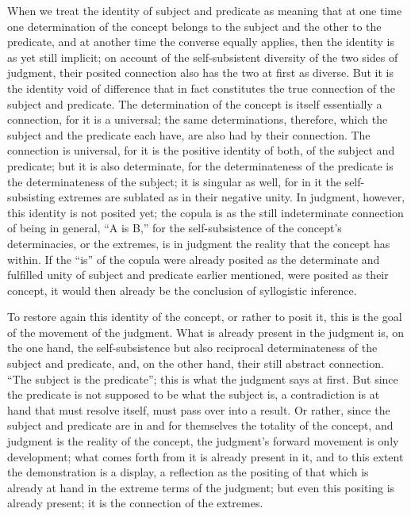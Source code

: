 When we treat the identity of subject and predicate
as meaning that at one time one determination of the concept
belongs to the subject and the other to the predicate,
and at another time the converse equally applies,
then the identity is as yet still implicit;
on account of the self-subsistent
diversity of the two sides of judgment,
their posited connection also has
the two at first as diverse.
But it is the identity void of difference
that in fact constitutes the true connection
of the subject and predicate.
The determination of the concept is itself
essentially a connection, for it is a universal;
the same determinations, therefore,
which the subject and the predicate each have,
are also had by their connection.
The connection is universal,
for it is the positive identity of both,
of the subject and predicate;
but it is also determinate,
for the determinateness of the predicate is
the determinateness of the subject;
it is singular as well, for in it the self-subsisting extremes are
sublated as in their negative unity.
In judgment, however, this identity is not posited yet;
the copula is as the still indeterminate connection of being in general,
“A is B,” for the self-subsistence of the concept's determinacies,
or the extremes, is in judgment the reality
that the concept has within.
If the “is” of the copula were already posited as the determinate
and fulfilled unity of subject and predicate earlier mentioned,
were posited as their concept,
it would then already be the conclusion of syllogistic inference.

To restore again this identity of the concept,
or rather to posit it,
this is the goal of the movement of the judgment.
What is already present in the judgment is,
on the one hand, the self-subsistence
but also reciprocal determinateness of
the subject and predicate,
and, on the other hand,
their still abstract connection.
“The subject is the predicate”;
this is what the judgment says at first.
But since the predicate is not
supposed to be what the subject is,
a contradiction is at hand that must resolve itself,
must pass over into a result.
Or rather, since the subject and predicate are
in and for themselves the totality of the concept,
and judgment is the reality of the concept,
the judgment's forward movement is only development;
what comes forth from it is already present in it,
and to this extent the demonstration is a display,
a reflection as the positing of that which is already
at hand in the extreme terms of the judgment;
but even this positing is already present;
it is the connection of the extremes.

